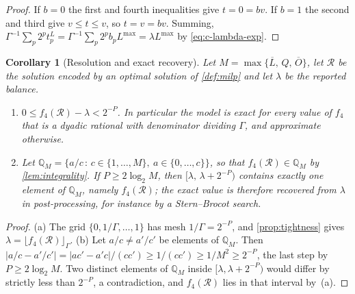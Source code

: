 \documentclass[11pt,a4paper]{article}
\theoremstyle{definition}
\theoremstyle{plain}
\newtheorem{corollary}[definition]{Corollary}
\newcommand{\Routes}{\mathcal{R}}
\newcommand{\Lmax}{L^{\max}}
\newcommand{\Lub}{\overline{L}}
\newcommand{\Oub}{\overline{O}}
\begin{document}
\begin{proof}
If $b = 0$ the first and fourth inequalities give $t = 0 = bv$.  If $b = 1$ the
second and third give $v \le t \le v$, so $t = v = bv$.  Summing,
$\Gamma^{-1}\sum_p 2^p t^L_p = \Gamma^{-1}\sum_p 2^p b_p \Lmax
= \lambda \Lmax$ by \eqref{eq:c-lambda-exp}.
\end{proof}

\begin{corollary}[Resolution and exact recovery]
\label{cor:resolution}
Let $M = \max\{\Lub,\, Q,\, \Oub\}$, let $\Routes$ be the solution encoded by an
optimal solution of \cref{def:milp} and let $\lambda$ be the reported balance.
\begin{enumerate}[label=(\alph*),leftmargin=*]
\item $0 \le f_4(\Routes) - \lambda < 2^{-P}$.  In particular the model is
  exact for every value of $f_4$ that is a dyadic rational with denominator
  dividing $\Gamma$, and approximate otherwise.
\item Let $\mathbb{Q}_M = \{ a/c \,:\, c \in \{1,\dots,M\},\ a \in
  \{0,\dots,c\} \}$, so that $f_4(\Routes) \in \mathbb{Q}_M$ by
  \cref{lem:integrality}.  If $P \ge 2\log_2 M$, then
  $[\lambda,\, \lambda + 2^{-P})$ contains exactly one element of
  $\mathbb{Q}_M$, namely $f_4(\Routes)$; the exact value is therefore recovered
  from $\lambda$ in post-processing, for instance by a Stern--Brocot search.
\end{enumerate}
\end{corollary}

\begin{proof}
(a) The grid $\{0,1/\Gamma,\dots,1\}$ has mesh $1/\Gamma = 2^{-P}$, and
\cref{prop:tightness} gives $\lambda = \lfloor f_4(\Routes) \rfloor_\Gamma$.
(b) Let $a/c \ne a'/c'$ be elements of $\mathbb{Q}_M$.  Then
$|a/c - a'/c'| = |ac' - a'c|/(cc') \ge 1/(cc') \ge 1/M^2 \ge 2^{-P}$, the last
step by $P \ge 2\log_2 M$.  Two distinct elements of $\mathbb{Q}_M$ inside
$[\lambda, \lambda + 2^{-P})$ would differ by strictly less than $2^{-P}$, a
contradiction, and $f_4(\Routes)$ lies in that interval by~(a).
\end{proof}
\end{document}
